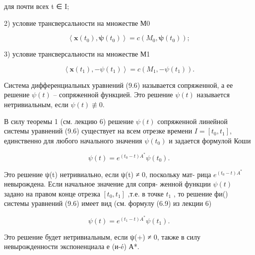 \documentclass[8pt]{extarticle}
\begin{document}
для почти всех t ∈ I;

2) условие трансверсальности на множестве М0

\[
\left\langle  {\mathbf{x}\left( {t}_{0}\right) ,\mathbf{\psi }\left( {t}_{0}\right) }\right\rangle   = c\left( {{M}_{0},\mathbf{\psi }\left( {t}_{0}\right) }\right) ; \tag{9.8}
\]

3) условие трансверсальности на множестве М1

\[
\left\langle  {\mathbf{x}\left( {t}_{1}\right) , - \psi \left( {t}_{1}\right) }\right\rangle   = c\left( {{M}_{1}, - \psi \left( {t}_{1}\right) }\right) . \tag{9.9}
\]

Система дифференциальных уравнений (9.6) называется сопряженной, а ее решение \(\psi(t)\) -- сопряженной функцией. Это решение \(\psi(t)\) называется нетривиальным, если \(\psi(t) \not\equiv 0\).

В силу теоремы 1 (см. лекцию 6) решение \(\psi(t)\) сопряженной линейной системы уравнений (9.6) существует на всем отрезке времени \(I = \left[ t_{0},t_{1}\right]\), единственно для любого начального значения \(\psi \left( t_{0}\right)\) и задается формулой Коши

\[
\psi \left( t\right)  = {e}^{\left( {{t}_{0} - t}\right) {A}^{ * }}\psi \left( {t}_{0}\right) . \tag{9.10}
\]

Это решение ψ(t) нетривиально, если ψ(t) ≠ 0, поскольку мат- рица \({e}^{\left( {{t}_{0} - t}\right) {A}^{ * }}\) невырождена. Если начальное значение для сопря- женной функции \(\psi \left( t\right)\) задано на правом конце отрезка \(\left\lbrack  {{t}_{0},{t}_{1}}\right\rbrack\) ,т.е. в точке \({t}_{1}\) , то решение фи() системы уравнений (9.6) имеет вид (см. формулу (6.9) из лекции 6)

\[
\psi \left( t\right)  = {e}^{\left( {{t}_{1} - t}\right) {A}^{ * }}\psi \left( {t}_{1}\right) . \tag{9.11}
\]

Это решение будет нетривиальным, если ψ(+) ≠ 0, также в силу невырожденности экспоненциала е (и-é) А*.
\end{document}
